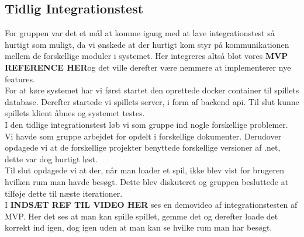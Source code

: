 \subsection{Tidlig Integrationstest}
For gruppen var det et mål at komme igang med at lave integrationstest så hurtigt som muligt, da vi ønskede at der hurtigt kom styr på kommunikationen mellem de forskellige moduler i systemet. Her integreres altså blot vores \textbf{MVP REFERENCE HER}og det ville derefter være nemmere at implementerer nye features.\\

For at køre systemet har vi først startet den oprettede docker container til spillets database. Derefter startede vi spillets server, i form af backend api. Til slut kunne spillets klient åbnes og systemet testes.\\

I den tidlige integrationstest løb vi som gruppe ind nogle forskellige problemer.\\
Vi havde som gruppe arbejdet for opdelt i forskellige dokumenter. 
Derudover opdagede vi at de forskellige projekter benyttede forskellige versioner af .net, dette var dog hurtigt løst.\\
Til slut opdagede vi at der, når man loader et spil, ikke blev vist for brugeren hvilken rum man havde besøgt. Dette blev diskuteret og gruppen besluttede at tilføje dette til næste iterationer.\\

I \textbf{INDSÆT REF TIL VIDEO HER} ses en demovideo af integrationstesten af MVP. Her det ses at man kan spille spillet, gemme det og derefter loade det korrekt ind igen, dog igen uden at man kan se hvilke rum man har besøgt.
